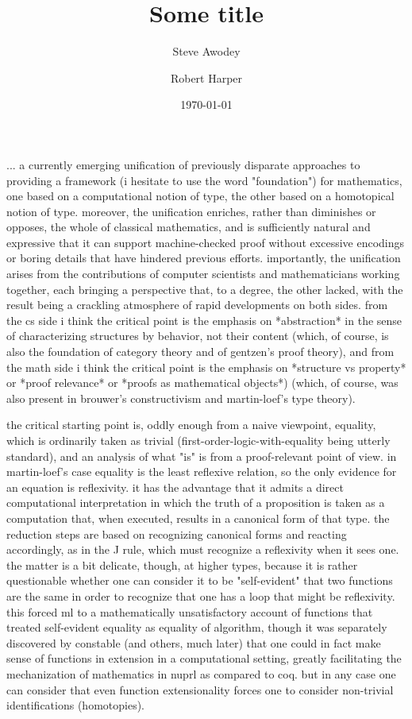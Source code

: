 \documentclass[11pt]{article}
\theoremstyle{remark}
\theoremstyle{definition}
\begin{document}

\title{Some title}
\author{Steve Awodey \and Robert Harper}
\date{\today}

\maketitle


... a currently emerging unification of previously disparate approaches to providing a framework (i hesitate to use the word "foundation") for mathematics, one based on a computational notion of type, the other based on a homotopical notion of type.  moreover, the unification enriches, rather than diminishes or opposes, the whole of classical mathematics, and is sufficiently natural and expressive that it can support machine-checked proof without excessive encodings or boring details that have hindered previous efforts.  importantly, the unification arises from the contributions of computer scientists and mathematicians working together, each bringing a perspective that, to a degree, the other lacked, with the result being a crackling atmosphere of rapid developments on both sides.  from the cs side i think the critical point is the emphasis on *abstraction* in the sense of characterizing structures by behavior, not their content (which, of course, is also the foundation of category theory and of gentzen's proof theory), and from the math side i think the critical point is the emphasis on *structure vs property* or *proof relevance* or *proofs as mathematical objects*) (which, of course, was also present in brouwer's constructivism and martin-loef's type theory).

the critical starting point is, oddly enough from a naive viewpoint, equality, which is ordinarily taken as trivial (first-order-logic-with-equality being utterly standard), and an analysis of what "is" is from a proof-relevant point of view.  in martin-loef's case equality is the least reflexive relation, so the only evidence for an equation is reflexivity.  it has the advantage that it admits a direct computational interpretation in which the truth of a proposition is taken as a computation that, when executed, results in a canonical form of that type.  the reduction steps are based on recognizing canonical forms and reacting accordingly, as in the J rule, which must recognize a reflexivity when it sees one.  the matter is a bit delicate, though, at higher types, because it is rather questionable whether one can consider it to be "self-evident" that two functions are the same in order to recognize that one has a loop that might be reflexivity.  this forced ml to a mathematically unsatisfactory account of functions that treated self-evident equality as equality of algorithm, though it was separately discovered by constable (and others, much later) that one could in fact make sense of functions in extension in a computational setting, greatly facilitating the mechanization of mathematics in nuprl as compared to coq.  but in any case one can consider that even function extensionality forces one to consider non-trivial identifications (homotopies).
\end{document}
